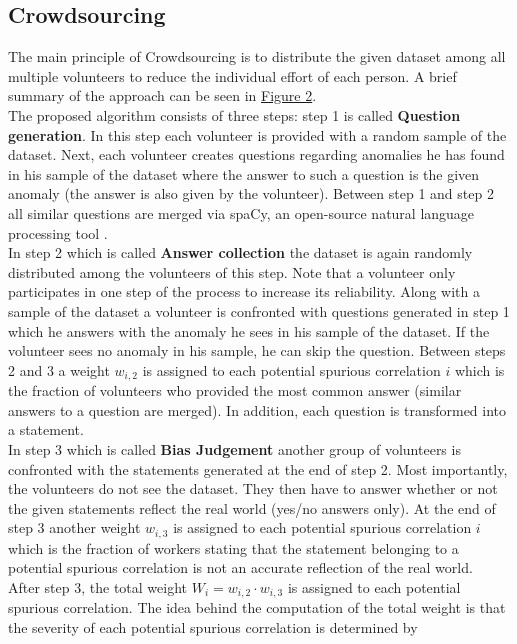 \documentclass{article}
\begin{document}
\subsection{Crowdsourcing}
The main principle of Crowdsourcing \cite{10.1145/3366423.3380063} is to distribute the given dataset
among all multiple volunteers to reduce the individual effort of each person. A brief summary of the approach
can be seen in \hyperref[fig:crowdsourcing]{Figure 2}. \\
The proposed algorithm consists of three steps: step 1 is called \textbf{Question generation}.
In this step each volunteer is provided with a random sample of the dataset. Next, each volunteer creates questions regarding
anomalies he has found in his sample of the dataset where the answer to such a question is the given anomaly
(the answer is also given by the volunteer). Between step 1 and step 2 all similar questions are merged via spaCy,
an open-source natural language processing tool \cite{spaCy}. \\
In step 2 which is called \textbf{Answer collection} the dataset is again randomly distributed among the volunteers
of this step. Note that a volunteer only participates in one step of the process to increase its reliability.
Along with a sample of the dataset a volunteer is confronted with questions generated in step 1 which he answers with the
anomaly he sees in his sample of the dataset. If the volunteer sees no anomaly in his sample, he can skip the question.
Between steps 2 and 3 a weight $w_{i,2}$ is assigned to each potential spurious correlation $i$ which is the fraction of
volunteers who provided the most common answer (similar answers to a question are merged).
In addition, each question is transformed into a statement. \\
In step 3 which is called \textbf{Bias Judgement} another group of volunteers is confronted with the statements
generated at the end of step 2. Most importantly, the volunteers do not see the dataset.
They then have to answer whether or not the given statements reflect the real world (yes/no answers only).
At the end of step 3 another weight $w_{i,3}$ is assigned to each potential spurious correlation $i$ which is the fraction
of workers stating that the statement belonging to a potential spurious correlation is not an accurate
reflection of the real world. \\
After step 3, the total weight $W_{i}=w_{i,2} \cdot w_{i,3}$ is assigned to each potential spurious correlation. The idea
behind the computation of the total weight is that the severity of each potential spurious correlation is determined by
\end{document}
